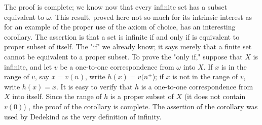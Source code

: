 The proof is complete; we know now that every infinite set has a subset equivalent to $\omega$. This result, proved here not so much for its intrinsic interest as for an example of the proper use of the axiom of choice, has an interesting corollary. The assertion is that a set is infinite if and only if is equivalent to proper subset of itself. The "if" we already know; it says merely that a finite set cannot be equivalent to a proper subset. To prove the "only if," suppose that $X$ is infinite, and let $v$ be a one-to-one correspondence from $\omega$ into $X$. If $x$ is in the range of $v$, say $x = v(n)$, write $h(x) = v(n^{+}$); if $x$ is not in the range of $v$, write $h(x)= x$. It is easy to verify that $h$ is a one-to-one correspondence from $X$ into itself. Since the range of $h$ is a proper subset of $X$ (it does not contain $v(0)$) , the proof of the corollary is complete. The assertion of the corollary was used by Dedekind as the very definition of infinity.